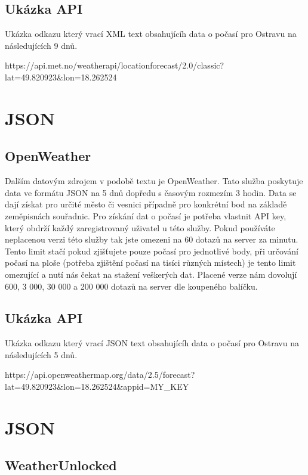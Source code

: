 \documentclass[czech,bachelor,dept460,male,csharp,cpdeclaration]{diploma}
\begin{document}
	\subsection{Ukázka API}
	
	Ukázka odkazu který vrací XML text obsahujícíh data o počasí pro Ostravu na následujících 9 dnů.
	
	https://api.met.no/weatherapi/locationforecast/2.0/classic?lat=49.820923\&lon=18.262524
	
	\section{JSON}
	\subsection{OpenWeather}
	
	Dalším datovým zdrojem v podobě textu je OpenWeather. Tato služba poskytuje data ve formátu JSON na 5 dnů dopředu s časovým rozmezím 3 hodin. Data se dají získat pro určité město či vesnici případně pro konkrétní bod na základě zeměpisnách souřadnic. Pro získání dat o počasí je potřeba vlastnit API key, který obdrží každý zaregistrovaný uživatel u této služby. Pokud používáte neplacenou verzi této služby tak jste omezeni na 60 dotazů na server za minutu. Tento limit stačí pokud zjišťujete pouze počasí pro jednotlivé body, při určování počasí na ploše (potřeba zjištění počasí na tisíci různých místech) je tento limit omezující a nutí nás čekat na stažení veškerých dat. Placené verze nám dovolují 600, 3 000, 30 000 a 200 000 dotazů na server dle koupeného balíčku.
	
	\subsection{Ukázka API}
	
	Ukázka odkazu který vrací JSON text obsahujícíh data o počasí pro Ostravu na následujících 5 dnů.
	
	https://api.openweathermap.org/data/2.5/forecast?lat=49.820923\&lon=18.262524\&appid=MY\_KEY
	
	\section{JSON}
	\subsection{WeatherUnlocked}
	
\end{document}
